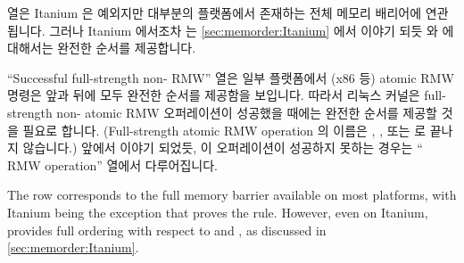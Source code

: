 {{	

	 열은 Itanium 은 예외지만 대부분의 플랫폼에서 존재하는
	전체 메모리 배리어에 연관됩니다.
	그러나 Itanium 에서조차  는
	\cref{sec:memorder:Itanium} 에서 이야기 되듯  와
	 에 대해서는 완전한 순서를 제공합니다.

	``Successful full-strength non- RMW'' 열은 일부 플랫폼에서
	(x86 등) atomic RMW 명령은 앞과 뒤에 모두 완전한 순서를 제공함을
	보입니다.
	따라서 리눅스 커널은 full-strength non- atomic RMW
	오퍼레이션이 성공했을 때에는 완전한 순서를 제공할 것을 필요로 합니다.
	(Full-strength atomic RMW operation 의 이름은 ,
	, 또는  로 끝나지 않습니다.)
	앞에서 이야기 되었듯, 이 오퍼레이션이 성공하지 못하는 경우는
	`` RMW operation'' 열에서 다루어집니다.

	\iffalse

	The  row corresponds to the full memory barrier
	available on most platforms, with Itanium being the exception
	that proves the rule.
	However, even on Itanium,  provides full ordering
	with respect to  and ,
	as discussed in \cref{sec:memorder:Itanium}.

}}
